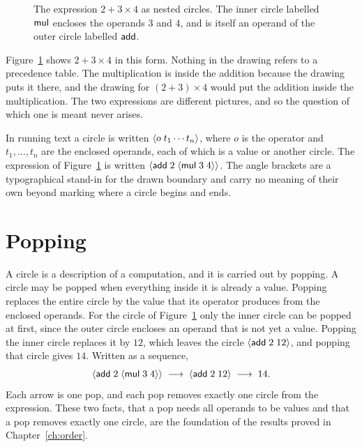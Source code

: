 \begin{figure}[t]
\centering
{}
\caption{The expression $2 + 3\times 4$ as nested circles. The inner circle labelled $\mathsf{mul}$ encloses the operands $3$ and $4$, and is itself an operand of the outer circle labelled $\mathsf{add}$.}
\label{fig:first-circle}
\end{figure}

Figure~\ref{fig:first-circle} shows $2 + 3 \times 4$ in this form. Nothing in the drawing refers to a precedence table. The multiplication is inside the addition because the drawing puts it there, and the drawing for $(2 + 3) \times 4$ would put the addition inside the multiplication. The two expressions are different pictures, and so the question of which one is meant never arises.

In running text a circle is written $\langle o\; t_1 \cdots t_n\rangle$, where $o$ is the operator and $t_1,\dots,t_n$ are the enclosed operands, each of which is a value or another circle. The expression of Figure~\ref{fig:first-circle} is written $\langle \mathsf{add}\; 2\; \langle \mathsf{mul}\; 3\; 4\rangle\rangle$. The angle brackets are a typographical stand-in for the drawn boundary and carry no meaning of their own beyond marking where a circle begins and ends.

\section{Popping}

A circle is a description of a computation, and it is carried out by popping. A circle may be popped when everything inside it is already a value. Popping replaces the entire circle by the value that its operator produces from the enclosed operands. For the circle of Figure~\ref{fig:first-circle} only the inner circle can be popped at first, since the outer circle encloses an operand that is not yet a value. Popping the inner circle replaces it by $12$, which leaves the circle $\langle \mathsf{add}\; 2\; 12\rangle$, and popping that circle gives $14$. Written as a sequence,
\[
\langle \mathsf{add}\; 2\; \langle \mathsf{mul}\; 3\; 4\rangle\rangle
\;\longrightarrow\;
\langle \mathsf{add}\; 2\; 12\rangle
\;\longrightarrow\;
14 .
\]
Each arrow is one pop, and each pop removes exactly one circle from the expression. These two facts, that a pop needs all operands to be values and that a pop removes exactly one circle, are the foundation of the results proved in Chapter~\ref{ch:order}.

